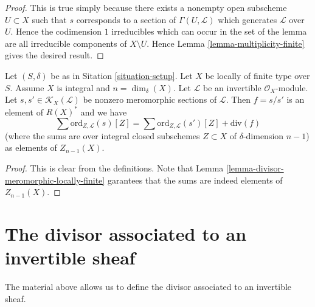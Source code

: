 \begin{proof}
This is true simply because there exists a nonempty open subscheme
$U \subset X$ such that $s$ corresponds to a section of
$\Gamma(U, \mathcal{L})$ which generates $\mathcal{L}$ over $U$.
Hence the codimension $1$
irreducibles which can occur in the set of the lemma are all
irreducible components of $X \setminus U$.
Hence Lemma \ref{lemma-multiplicity-finite} gives the desired result.
\end{proof}

\begin{lemma}
\label{lemma-divisor-meromorphic-well-defined}
Let $(S, \delta)$ be as in Sitation \ref{situation-setup}.
Let $X$ be locally of finite type over $S$. Assume $X$ is
integral and $n = \dim_\delta(X)$.
Let $\mathcal{L}$ be an invertible $\mathcal{O}_X$-module.
Let $s, s' \in \mathcal{K}_X(\mathcal{L})$ be nonzero
meromorphic sections of $\mathcal{L}$. Then $f = s/s'$
is an element of $R(X)^*$ and we have
$$
\sum \text{ord}_{Z, \mathcal{L}}(s)[Z]
=
\sum \text{ord}_{Z, \mathcal{L}}(s')[Z]
+
\text{div}(f)
$$
(where the sums are over integral closed subschemes $Z \subset X$
of $\delta$-dimension $n - 1$) as elements of $Z_{n - 1}(X)$.
\end{lemma}

\begin{proof}
This is clear from the definitions.
Note that Lemma \ref{lemma-divisor-meromorphic-locally-finite}
garantees that the sums are indeed
elements of $Z_{n - 1}(X)$.
\end{proof}









\section{The divisor associated to an invertible sheaf}
\label{section-divisor-invertible-sheaf}

\noindent
The material above allows us to define the divisor
associated to an invertible sheaf.

